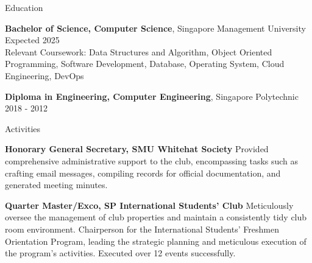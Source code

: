 \documentclass{resume} %
\begin{document}

\begin{rSection}{Education}

{\bf Bachelor of Science, Computer Science}, Singapore Management University \hfill {Expected 2025}\\
Relevant Coursework: Data Structures and Algorithm, Object Oriented Programming, Software Development, Database, Operating System, Cloud Engineering, DevOps

{\bf Diploma in Engineering, Computer Engineering}, Singapore Polytechnic \hfill {2018 - 2012}

\end{rSection}

\begin{rSection}{Activities} 
\vspace{-1.25em}

\item \textbf{Honorary General Secretary, SMU Whitehat Society} {Provided comprehensive administrative support to the club, encompassing tasks such as crafting email messages, compiling records for official documentation, and generated meeting minutes.}

\item \textbf{Quarter Master/Exco, SP International Students' Club} {Meticulously oversee the management of club properties and maintain a consistently tidy club room environment. Chairperson for the International Students' Freshmen Orientation Program, leading the strategic planning and meticulous execution of the program's activities. Executed over 12 events successfully.}

\end{rSection}
\end{document}
